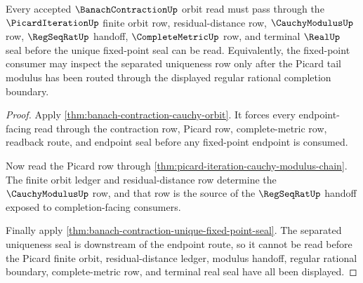 \begin{theorem}
\label{thm:banach-contraction-picard-tail-modulus}
Every accepted $\BanachContractionUp$ orbit read must pass through the $\PicardIterationUp$ finite orbit row, residual-distance row, $\CauchyModulusUp$ row, $\RegSeqRatUp$ handoff, $\CompleteMetricUp$ row, and terminal $\RealUp$ seal before the unique fixed-point seal can be read. Equivalently, the fixed-point consumer may inspect the separated uniqueness row only after the Picard tail modulus has been routed through the displayed regular rational completion boundary.
\end{theorem}
\begin{proof}
Apply \autoref{thm:banach-contraction-cauchy-orbit}. It forces every endpoint-facing read through the contraction row, Picard row, complete-metric row, readback route, and endpoint seal before any fixed-point endpoint is consumed.

Now read the Picard row through \autoref{thm:picard-iteration-cauchy-modulus-chain}. The finite orbit ledger and residual-distance row determine the $\CauchyModulusUp$ row, and that row is the source of the $\RegSeqRatUp$ handoff exposed to completion-facing consumers.

Finally apply \autoref{thm:banach-contraction-unique-fixed-point-seal}. The separated uniqueness seal is downstream of the endpoint route, so it cannot be read before the Picard finite orbit, residual-distance ledger, modulus handoff, regular rational boundary, complete-metric row, and terminal real seal have all been displayed.
\end{proof}

